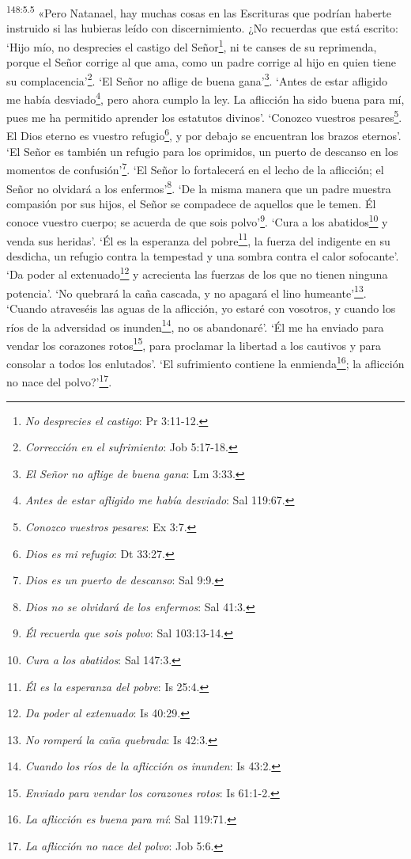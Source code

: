 \par 
\textsuperscript{148:5.5} «Pero Natanael, hay muchas cosas en las Escrituras que podrían haberte instruido si las hubieras leído con discernimiento. ¿No recuerdas que está escrito: `Hijo mío, no desprecies el castigo del Señor\footnote{\textit{No desprecies el castigo}: Pr 3:11-12.}, ni te canses de su reprimenda, porque el Señor corrige al que ama, como un padre corrige al hijo en quien tiene su complacencia'\footnote{\textit{Corrección en el sufrimiento}: Job 5:17-18.}. `El Señor no aflige de buena gana'\footnote{\textit{El Señor no aflige de buena gana}: Lm 3:33.}. `Antes de estar afligido me había desviado\footnote{\textit{Antes de estar afligido me había desviado}: Sal 119:67.}, pero ahora cumplo la ley. La aflicción ha sido buena para mí, pues me ha permitido aprender los estatutos divinos'. `Conozco vuestros pesares\footnote{\textit{Conozco vuestros pesares}: Ex 3:7.}. El Dios eterno es vuestro refugio\footnote{\textit{Dios es mi refugio}: Dt 33:27.}, y por debajo se encuentran los brazos eternos'. `El Señor es también un refugio para los oprimidos, un puerto de descanso en los momentos de confusión'\footnote{\textit{Dios es un puerto de descanso}: Sal 9:9.}. `El Señor lo fortalecerá en el lecho de la aflicción; el Señor no olvidará a los enfermos'\footnote{\textit{Dios no se olvidará de los enfermos}: Sal 41:3.}. `De la misma manera que un padre muestra compasión por sus hijos, el Señor se compadece de aquellos que le temen. Él conoce vuestro cuerpo; se acuerda de que sois polvo'\footnote{\textit{Él recuerda que sois polvo}: Sal 103:13-14.}. `Cura a los abatidos\footnote{\textit{Cura a los abatidos}: Sal 147:3.} y venda sus heridas'. `Él es la esperanza del pobre\footnote{\textit{Él es la esperanza del pobre}: Is 25:4.}, la fuerza del indigente en su desdicha, un refugio contra la tempestad y una sombra contra el calor sofocante'. `Da poder al extenuado\footnote{\textit{Da poder al extenuado}: Is 40:29.} y acrecienta las fuerzas de los que no tienen ninguna potencia'. `No quebrará la caña cascada, y no apagará el lino humeante'\footnote{\textit{No romperá la caña quebrada}: Is 42:3.}. `Cuando atraveséis las aguas de la aflicción, yo estaré con vosotros, y cuando los ríos de la adversidad os inunden\footnote{\textit{Cuando los ríos de la aflicción os inunden}: Is 43:2.}, no os abandonaré'. `Él me ha enviado para vendar los corazones rotos\footnote{\textit{Enviado para vendar los corazones rotos}: Is 61:1-2.}, para proclamar la libertad a los cautivos y para consolar a todos los enlutados'. `El sufrimiento contiene la enmienda\footnote{\textit{La aflicción es buena para mí}: Sal 119:71.}; la aflicción no nace del polvo?'\footnote{\textit{La aflicción no nace del polvo}: Job 5:6.}.

